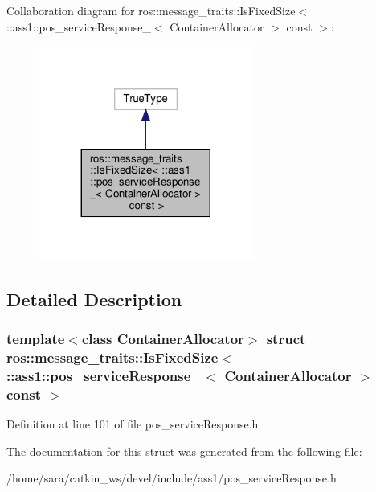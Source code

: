 Collaboration diagram for ros\+:\+:message\+\_\+traits\+:\+:Is\+Fixed\+Size$<$ \+:\+:ass1\+:\+:pos\+\_\+service\+Response\+\_\+$<$ Container\+Allocator $>$ const $>$\+:
\nopagebreak
\begin{figure}[H]
\begin{center}
\leavevmode
\includegraphics[width=200pt]{structros_1_1message__traits_1_1IsFixedSize_3_01_1_1ass1_1_1pos__serviceResponse___3_01Containera80f16707a9e96340c40c4adcf21b2b0}
\end{center}
\end{figure}


\subsection{Detailed Description}
\subsubsection*{template$<$class Container\+Allocator$>$\newline
struct ros\+::message\+\_\+traits\+::\+Is\+Fixed\+Size$<$ \+::ass1\+::pos\+\_\+service\+Response\+\_\+$<$ Container\+Allocator $>$ const $>$}



Definition at line 101 of file pos\+\_\+service\+Response.\+h.



The documentation for this struct was generated from the following file\+:\begin{DoxyCompactItemize}
\item 
/home/sara/catkin\+\_\+ws/devel/include/ass1/pos\+\_\+service\+Response.\+h\end{DoxyCompactItemize}
